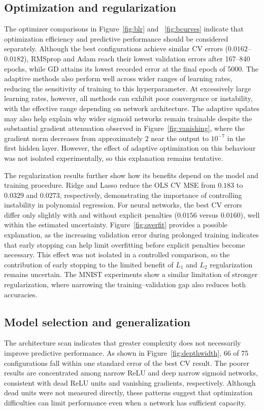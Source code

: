 \documentclass[amssymb,twocolumn,aps]{revtex4}
\begin{document}
\subsection{Optimization and regularization}
The optimizer comparisons in Figure~\ref{fig:blr} and ~\ref{fig:bcurves}  indicate that optimization efficiency and predictive performance should be considered separately. Although the best configurations achieve similar CV errors ($0.0162$–$0.0182$), RMSprop and Adam reach their lowest validation errors after 167–840 epochs, while GD attains its lowest recorded error at the final epoch of 5000. The adaptive methods also perform well across wider ranges of learning rates, reducing the sensitivity of training to this hyperparameter. At excessively large learning rates, however, all methods can exhibit poor convergence or instability, with the effective range depending on network architecture. The adaptive updates may also help explain why wider sigmoid networks remain trainable despite the substantial gradient attenuation observed in Figure~\ref{fig:vanishing}, where the gradient norm decreases from approximately $2$ near the output to $10^{-7}$ in the first hidden layer. However, the effect of adaptive optimization on this behaviour was not isolated experimentally, so this explanation remains tentative.

The regularization results further show how its benefits depend on the model and training procedure. Ridge and Lasso reduce the OLS CV MSE from $0.183$ to $0.0329$ and $0.0273$, respectively, demonstrating the importance of controlling instability in polynomial regression. For neural networks, the best CV errors differ only slightly with and without explicit penalties ($0.0156$ versus $0.0160$), well within the estimated uncertainty. Figure~\ref{fig:overfit} provides a possible explanation, as the increasing validation error during prolonged training indicates that early stopping can help limit overfitting before explicit penalties become necessary. This effect was not isolated in a controlled comparison, so the contribution of early stopping to the limited benefit of $L_1$ and $L_2$ regularization remains uncertain. The MNIST experiments show a similar limitation of stronger regularization, where narrowing the training–validation gap also reduces both accuracies.

\subsection{Model selection and generalization}
The architecture scan indicates that greater complexity does not necessarily improve predictive performance. As shown in Figure~\ref{fig:depthwidth}, 66 of 75 configurations fall within one standard error of the best CV result. The poorer results are concentrated among narrow ReLU and deep narrow sigmoid networks, consistent with dead ReLU units and vanishing gradients, respectively. Although dead units were not measured directly, these patterns suggest that optimization difficulties can limit performance even when a network has sufficient capacity.
\end{document}
